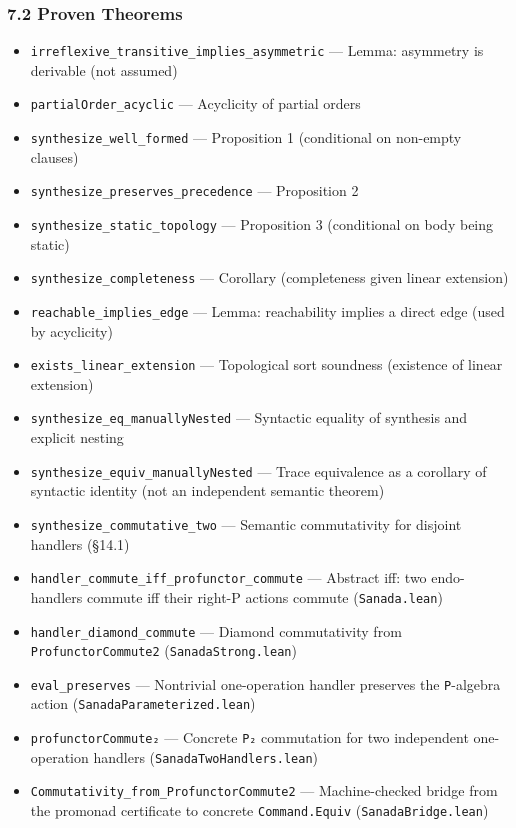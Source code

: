 \documentclass[
  11pt,
]{article}
\providecommand{\tightlist}{%
  \setlength{\itemsep}{0pt}\setlength{\parskip}{0pt}}
\begin{document}
\subsubsection{7.2 Proven Theorems}\label{proven-theorems}

\begin{itemize}
\tightlist
\item
  \texttt{irreflexive\_transitive\_implies\_asymmetric} --- Lemma:
  asymmetry is derivable (not assumed)
\item
  \texttt{partialOrder\_acyclic} --- Acyclicity of partial orders
\item
  \texttt{synthesize\_well\_formed} --- Proposition 1 (conditional on
  non-empty clauses)
\item
  \texttt{synthesize\_preserves\_precedence} --- Proposition 2
\item
  \texttt{synthesize\_static\_topology} --- Proposition 3 (conditional
  on body being static)
\item
  \texttt{synthesize\_completeness} --- Corollary (completeness given
  linear extension)
\item
  \texttt{reachable\_implies\_edge} --- Lemma: reachability implies a
  direct edge (used by acyclicity)
\item
  \texttt{exists\_linear\_extension} --- Topological sort soundness
  (existence of linear extension)
\item
  \texttt{synthesize\_eq\_manuallyNested} --- Syntactic equality of
  synthesis and explicit nesting
\item
  \texttt{synthesize\_equiv\_manuallyNested} --- Trace equivalence as a
  corollary of syntactic identity (not an independent semantic theorem)
\item
  \texttt{synthesize\_commutative\_two} --- Semantic commutativity for
  disjoint handlers (§14.1)
\item
  \texttt{handler\_commute\_iff\_profunctor\_commute} --- Abstract iff:
  two endo-handlers commute iff their right-P actions commute
  (\texttt{Sanada.lean})
\item
  \texttt{handler\_diamond\_commute} --- Diamond commutativity from
  \texttt{ProfunctorCommute2} (\texttt{SanadaStrong.lean})
\item
  \texttt{eval\_preserves} --- Nontrivial one-operation handler
  preserves the \texttt{P}-algebra action
  (\texttt{SanadaParameterized.lean})
\item
  \texttt{profunctorCommute₂} --- Concrete \texttt{P₂} commutation for
  two independent one-operation handlers
  (\texttt{SanadaTwoHandlers.lean})
\item
  \texttt{Commutativity\_from\_ProfunctorCommute2} --- Machine-checked
  bridge from the promonad certificate to concrete
  \texttt{Command.Equiv} (\texttt{SanadaBridge.lean})
\end{itemize}
\end{document}
